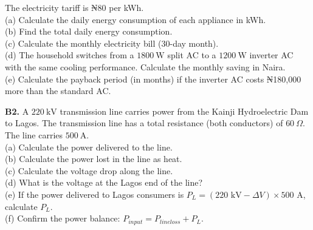 \begin{exercisebox}[24]
The electricity tariff is ₦80 per kWh.\\[4pt]
(a) Calculate the daily energy consumption of
each appliance in kWh.\\
(b) Find the total daily energy consumption.\\
(c) Calculate the monthly electricity bill
(30-day month).\\
(d) The household switches from a $1800\ \text{W}$
split AC to a $1200\ \text{W}$ inverter AC with
the same cooling performance. Calculate the
monthly saving in Naira.\\
(e) Calculate the payback period (in months) if
the inverter AC costs ₦180,000 more than the
standard AC.
\hfill{}

\vspace{0.4cm}

\textbf{B2.} A $220\ \text{kV}$ transmission line
carries power from the Kainji Hydroelectric Dam
to Lagos. The transmission line has a total
resistance (both conductors) of $60\ \Omega$.
The line carries $500\ \text{A}$.\\[4pt]
(a) Calculate the power delivered to the line.\\
(b) Calculate the power lost in the line as heat.\\
(c) Calculate the voltage drop along the line.\\
(d) What is the voltage at the Lagos end of the line?\\
(e) If the power delivered to Lagos consumers
is $P_L = (220\text{ kV} - \Delta V) \times 500\text{ A}$,
calculate $P_L$.\\
(f) Confirm the power balance:
$P_{input} = P_{line loss} + P_L$.
\hfill{}

\begin{center}
\end{center}


\end{exercisebox}
